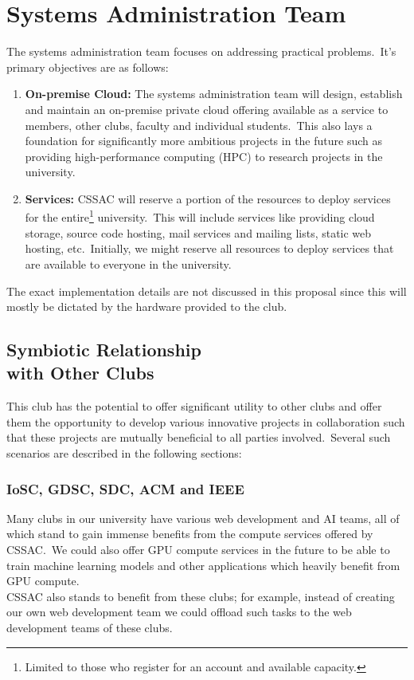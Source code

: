 \documentclass[a4paper,11pt,twocolumn,oneside]{book}
\begin{document}
    \section{\large Systems Administration Team}\label{sec:systems-administration-team}
    The systems administration team focuses on addressing practical problems.\ It's primary objectives are as follows:
    \begin{enumerate}
        \item \textbf{On-premise Cloud:} The systems administration team will design, establish and maintain an
        on-premise private cloud offering available as a service to members, other clubs, faculty and individual
        students.\ This also lays a foundation for significantly more ambitious projects in the future such as providing
        high-performance computing (HPC) to research projects in the university.
        \item \textbf{Services:} CSSAC will reserve a portion of the resources to deploy services for the
        entire\footnote{Limited to those who register for an account and available capacity.} university.\ This will
        include services like providing cloud storage, source code hosting, mail services and mailing lists, static web
        hosting, etc.\ Initially, we might reserve all resources to deploy services that are available to everyone in
        the university.
    \end{enumerate}
    The exact implementation details are not discussed in this proposal since this will mostly be dictated by the
    hardware provided to the club.


    \subsection[Symbiotic Relationship with Other Clubs]{Symbiotic Relationship \\ with Other Clubs}
    \label{subsec:symbiotic-relationship-with-other-clubs}
    This club has the potential to offer significant utility to other clubs and offer them the opportunity to develop
    various innovative projects in collaboration such that these projects are mutually beneficial to all parties
    involved.\ Several such scenarios are described in the following sections:

    \subsubsection{IoSC, GDSC, SDC, ACM and IEEE}
    Many clubs in our university have various web development and AI teams, all of which stand to gain immense benefits
    from the compute services offered by CSSAC.\ We could also offer GPU compute services in the future to be able to
    train machine learning models and other applications which heavily benefit from GPU compute.
    \\
    CSSAC also stands to benefit from these clubs; for example, instead of creating our own web development team we
    could offload such tasks to the web development teams of these clubs\@.
\end{document}
